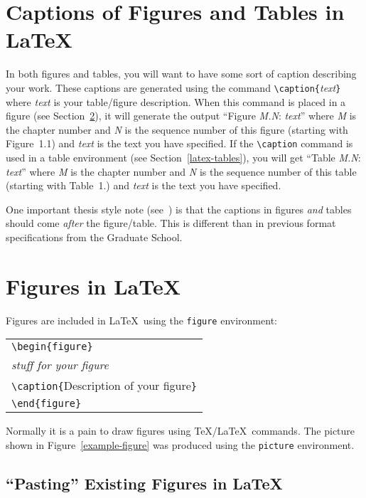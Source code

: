 \section{Captions of Figures and Tables in \LaTeX}
\label{latex-captions}

In both figures and tables, you will want to have some sort of caption
describing your work.  These captions are generated using the command
\verb#\caption{#{\em text}\verb#}# where {\em text} is your
table/figure description.  When this command is placed in a figure
(see Section~\ref{latex-figures}), it will generate the output
``Figure {\em M.N}: {\em text}'' where {\em M} is the chapter number and
{\em N} is the sequence number of
this figure (starting with Figure~1.1) and {\em text} is the text you
have specified.  If the \verb#\caption# command is used in a table
environment (see Section~\ref{latex-tables}), you will get ``Table
{\em M.N}: {\em text}'' where {\em M} is the chapter number and {\em N} is
the sequence number of this table (starting with Table~1.) and {\em text} is
the text you have specified.

One important thesis style note (see~\cite{osu:guidelines}) is that
the captions in figures {\em and} tables should come {\em after} the
figure/table.  This is different than in previous format specifications
from the Graduate School.


\section{Figures in \LaTeX}
\label{latex-figures}
Figures are included in \LaTeX\ using the {\tt figure} environment:
%
\begin{center}
\begin{tabular}{l}
\verb#\begin{figure}#\\
{\em stuff for your figure}\\
\verb#\caption{#Description of your figure\verb#}#\\
\verb#\end{figure}#
\end{tabular}
\end{center}
%
Normally it is a pain to draw figures using \TeX/\LaTeX\ commands. The
picture shown in Figure~\ref{example-figure} was produced using the
{\tt picture} environment.

\subsection{``Pasting'' Existing  Figures in \LaTeX}
\label{pasted-figures}

